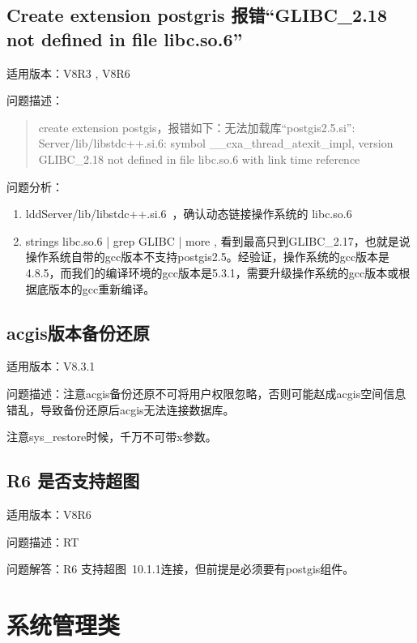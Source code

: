 \documentclass[a4,10pt,oneside,english]{sphinxmanual}
\begin{document}
\section{Create extension postgris 报错“GLIBC\_2.18 not defined in file libc.so.6”}
\label{\detokenize{gis:create-extension-postgris-glibc-2-18-not-defined-in-file-libc-so-6}}
适用版本：V8R3 , V8R6

问题描述：
\begin{quote}

create extension postgis，报错如下：无法加载库“postgis\sphinxhyphen{}2.5.si”: Server/lib/libstdc++.si.6: symbol \_\_cxa\_thread\_atexit\_impl, version GLIBC\_2.18 not defined in file libc.so.6 with link time reference
\end{quote}

问题分析：
\begin{enumerate}
%
\item {} 
lddServer/lib/libstdc++.si.6 ，确认动态链接操作系统的 libc.so.6

\item {} 
strings libc.so.6 | grep GLIBC | more , 看到最高只到GLIBC\_2.17，也就是说操作系统自带的gcc版本不支持postgis\sphinxhyphen{}2.5。经验证，操作系统的gcc版本是4.8.5，而我们的编译环境的gcc版本是5.3.1，需要升级操作系统的gcc版本或根据底版本的gcc重新编译。

\end{enumerate}


\section{acgis版本备份还原}
\label{\detokenize{gis:acgis}}
适用版本：V8.3.1

问题描述：注意acgis备份还原不可将用户权限忽略，否则可能赵成acgis空间信息错乱，导致备份还原后acgis无法连接数据库。

注意sys\_restore时候，千万不可带\sphinxhyphen{}x参数。


\section{R6 是否支持超图}
\label{\detokenize{gis:r6}}
适用版本：V8R6

问题描述：RT

问题解答：R6 支持超图 10.1.1连接，但前提是必须要有postgis组件。


\chapter{系统管理类}
\label{\detokenize{system-management:id1}}\label{\detokenize{system-management::doc}}
\end{document}
